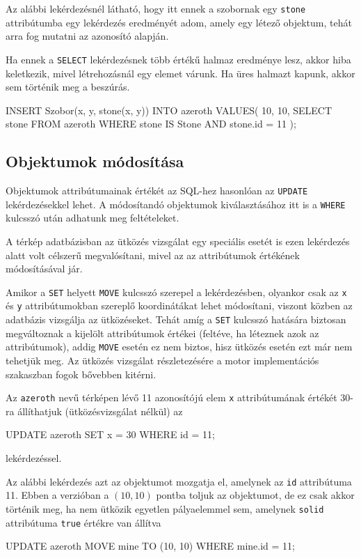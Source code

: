 Az alábbi lekérdezésnél látható, hogy itt ennek a szobornak egy \texttt{stone} attribútumba egy lekérdezés eredményét adom, amely egy létező objektum, tehát arra fog mutatni az azonosító alapján.

Ha ennek a \texttt{SELECT} lekérdezésnek több értékű halmaz eredménye lesz, akkor hiba keletkezik, mivel létrehozásnál egy elemet várunk. Ha üres halmazt kapunk, akkor sem történik meg a beszúrás.
\begin{sql}
INSERT Szobor(x, y, stone(x, y)) INTO azeroth VALUES(
    10, 10,
    SELECT stone FROM azeroth WHERE stone IS Stone AND stone.id = 11
);
\end{sql}

\subsection{Objektumok módosítása}

Objektumok attribútumainak értékét az SQL-hez hasonlóan az \texttt{UPDATE} lekérdezésekkel lehet. A módosítandó objektumok kiválasztásához itt is a \texttt{WHERE} kulcsszó után adhatunk meg feltételeket.

A térkép adatbázisban az ütközés vizsgálat egy speciális esetét is ezen lekérdezés alatt volt célszerű megvalósítani, mivel az az attribútumok értékének módosításával jár.

Amikor a \texttt{SET} helyett \texttt{MOVE} kulcsszó szerepel a lekérdezésben, olyankor csak az \texttt{x} és \texttt{y} attribútumokban szereplő koordinátákat lehet módosítani, viszont közben az adatbázis vizsgálja az ütközéseket. Tehát amíg a \texttt{SET} kulcsszó hatására biztosan megváltoznak a kijelölt attribútumok értékei (feltéve, ha léteznek azok az attribútumok), addig \texttt{MOVE} esetén ez nem biztos, hisz ütközés esetén ezt már nem tehetjük meg. Az ütközés vizsgálat részletezésére a motor implementációs szakaszban fogok bővebben kitérni.

Az \texttt{azeroth} nevű térképen lévő 11 azonosítójú elem \texttt{x} attribútumának értékét 30-ra állíthatjuk (ütközésvizsgálat nélkül) az
\begin{sql}
UPDATE azeroth SET x = 30 WHERE id = 11;
\end{sql}
lekérdezéssel.

Az alábbi lekérdezés azt az objektumot mozgatja el, amelynek az \texttt{id} attribútuma 11. Ebben a verzióban a $(10, 10)$ pontba toljuk az objektumot, de ez csak akkor történik meg, ha nem ütközik egyetlen pályaelemmel sem, amelynek \texttt{solid} attribútuma \texttt{true} értékre van állítva
\begin{sql}
UPDATE azeroth MOVE mine TO (10, 10) WHERE mine.id = 11;
\end{sql}

